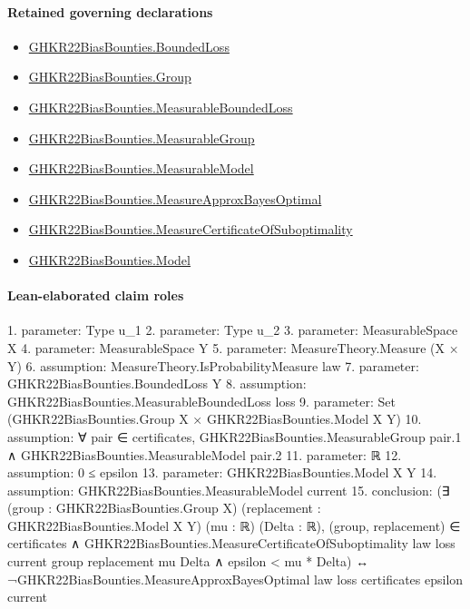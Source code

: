 \documentclass[10pt]{article}
\begin{document}
\paragraph{Retained governing declarations}
\begin{itemize}\raggedright
\item \hyperlink{paper-prerequisite-ef6c319b0770dad4}{GHKR22\allowbreak{}Bias\allowbreak{}Bounties.\allowbreak{}Bounded\allowbreak{}Loss}
\item \hyperlink{paper-prerequisite-cc7214115b27106f}{GHKR22\allowbreak{}Bias\allowbreak{}Bounties.\allowbreak{}Group}
\item \hyperlink{governing-declaration-56b96e1cde76e3f7}{GHKR22\allowbreak{}Bias\allowbreak{}Bounties.\allowbreak{}Measurable\allowbreak{}Bounded\allowbreak{}Loss}
\item \hyperlink{governing-declaration-8d5012d60e076f7c}{GHKR22\allowbreak{}Bias\allowbreak{}Bounties.\allowbreak{}Measurable\allowbreak{}Group}
\item \hyperlink{governing-declaration-8b721c00962c326a}{GHKR22\allowbreak{}Bias\allowbreak{}Bounties.\allowbreak{}Measurable\allowbreak{}Model}
\item \hyperlink{paper-prerequisite-7ae84fcf376c9f20}{GHKR22\allowbreak{}Bias\allowbreak{}Bounties.\allowbreak{}Measure\allowbreak{}Approx\allowbreak{}Bayes\allowbreak{}Optimal}
\item \hyperlink{paper-prerequisite-ad05480b2c897936}{GHKR22\allowbreak{}Bias\allowbreak{}Bounties.\allowbreak{}Measure\allowbreak{}Certificate\allowbreak{}Of\allowbreak{}Suboptimality}
\item \hyperlink{paper-prerequisite-333127605c12eba8}{GHKR22\allowbreak{}Bias\allowbreak{}Bounties.\allowbreak{}Model}
\end{itemize}
\paragraph{Lean-elaborated claim roles}\begin{ReviewVerbatim}
1. parameter: Type u_1
2. parameter: Type u_2
3. parameter: MeasurableSpace X
4. parameter: MeasurableSpace Y
5. parameter: MeasureTheory.Measure (X × Y)
6. assumption: MeasureTheory.IsProbabilityMeasure law
7. parameter: GHKR22BiasBounties.BoundedLoss Y
8. assumption: GHKR22BiasBounties.MeasurableBoundedLoss loss
9. parameter: Set (GHKR22BiasBounties.Group X × GHKR22BiasBounties.Model X Y)
10. assumption: ∀ pair ∈ certificates, GHKR22BiasBounties.MeasurableGroup pair.1 ∧ GHKR22BiasBounties.MeasurableModel pair.2
11. parameter: ℝ
12. assumption: 0 ≤ epsilon
13. parameter: GHKR22BiasBounties.Model X Y
14. assumption: GHKR22BiasBounties.MeasurableModel current
15. conclusion: (∃ (group : GHKR22BiasBounties.Group X) (replacement : GHKR22BiasBounties.Model X Y) (mu : ℝ) (Delta : ℝ),
    (group, replacement) ∈ certificates ∧
      GHKR22BiasBounties.MeasureCertificateOfSuboptimality law loss current group replacement mu Delta ∧
        epsilon < mu * Delta) ↔
  ¬GHKR22BiasBounties.MeasureApproxBayesOptimal law loss certificates epsilon current
\end{ReviewVerbatim}
\end{document}
